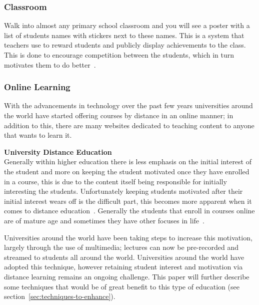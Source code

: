 \documentclass[a4paper,12pt]{article}
\begin{document}
\subsubsection{Classroom}\label{sec:classroom}
Walk into almost any primary school classroom and you will see a poster with a list of students names with stickers next to these names. This is a system that teachers use to reward students and publicly display achievements to the class. This is done to encourage competition between the students, which in turn motivates them to do better~\citep{school-kids}.

\subsubsection{Online Learning}
With the advancements in technology over the past few years universities around the world have started offering courses by distance in an online manner; in addition to this, there are many websites dedicated to teaching content to anyone that wants to learn it.

\par
\textbf{University Distance Education}\\
Generally within higher education there is less emphasis on the initial interest of the student and more on keeping the student motivated once they have enrolled in a course, this is due to the content itself being responsible for initially interesting the students. Unfortunately keeping students motivated after their initial interest wears off is the difficult part, this becomes more apparent when it comes to distance education~\citep{distance-education}.
Generally the students that enroll in courses online are of mature age and sometimes they have other focuses in life~\citep{distance-education}.

\par
Universities around the world have been taking steps to increase this motivation, largely through the use of multimedia; lectures can now be pre-recorded and streamed to students all around the world. Universities around the world have adopted this technique, however retaining student interest and motivation via distance learning remains an ongoing challenge. This paper will further describe some techniques that would be of great benefit to this type of education (see section~\ref{sec:techniques-to-enhance}).
\end{document}
